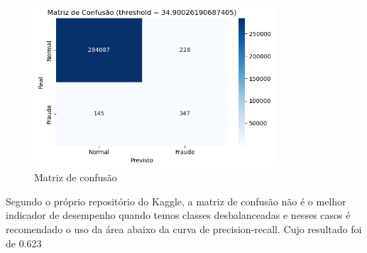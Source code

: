 \documentclass[conference]{IEEEtran}
\begin{document}
\begin{figure}[H]
    \centering
    \includegraphics[width=0.8\textwidth]{../output/matriz de confusao maximo f1.png}
    \caption{Matriz de confusão}
    \label{fig:matriz_confusao}
\end{figure}
Segundo o próprio repositório do Kaggle, a matriz de confusão não é o melhor indicador de desempenho quando temos classes desbalanceadas e nesses casos é recomendado o uso da área abaixo da curva de precision-recall. Cujo resultado foi de 0.623
\end{document}
